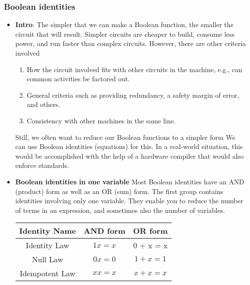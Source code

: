 \documentclass{report}
\begin{document}
    \pagebreak 
    \subsubsection{Boolean identities}
    \begin{itemize}
        \item \textbf{Intro}: The simpler that we can make a Boolean function, the smaller the circuit that will result.
            \bigbreak \noindent 
            Simpler circuits are cheaper to build, consume less power, and run faster than complex circuits.
            \bigbreak \noindent 
            However, there are other criteria involved
            \begin{enumerate}
                \item How the circuit involved fits with other circuits in the machine, e.g., can common activities be factored out.
                \item General criteria such as providing redundancy, a safety margin of error, and others.
                \item Consistency with other machines in the same line.
            \end{enumerate}
            \bigbreak \noindent 
            Still, we often want to reduce our Boolean functions to a simpler form
            \bigbreak \noindent 
            We can use Boolean identities (equations) for this.
            \bigbreak \noindent 
            In a real-world situation, this would be accomplished with the help of a hardware compiler that would also enforce standards.
            \bigbreak \noindent 
        \item \textbf{Boolean identities in one variable}
            Most Boolean identities have an AND (product) form as well as an OR (sum) form.
            \bigbreak \noindent 
            The first group contains identities involving only one variable. They enable you to reduce the number of terms in an expression, and sometimes also the number of variables.
            \begin{center}
                \begin{tabular}{c|c|c}
                    Identity Name & AND form & OR form \\ 
                    \hline
                    Identity Law & $1x =x$ & 0 + x = x\\
                    Null Law & $0x = 0 $ & $1 + x = 1 $ \\
                    Idempotent Law & $xx = x$ & $x + x = x$ \\

\end{tabular}
\end{center}
\end{itemize}
\end{document}
